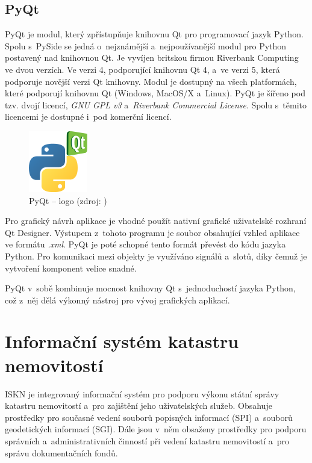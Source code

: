 \documentclass[a4paper,12pt,oneside]{book}
\begin{document}
\section{PyQt}

PyQt je modul, který zpřístupňuje knihovnu Qt pro programovací jazyk Python. Spolu s~PySide se jedná o~nejznámější a~nejpoužívanější modul pro Python postavený nad knihovnou Qt. Je vyvíjen britskou firmou Riverbank Computing ve dvou verzích. Ve verzi 4, podporující knihovnu Qt 4, a~ve verzi 5, která podporuje novější verzi Qt knihovny. Modul je dostupný na všech platformách, které podporují knihovnu Qt (Windows, MacOS/X a~Linux). PyQt je šířeno pod tzv. dvojí licencí, \textit{GNU GPL v3} a~\textit{Riverbank Commercial License}. Spolu s~těmito licencemi je dostupné i~pod komerční licencí.

\begin{figure}[htb]
\centering
\includegraphics[scale=1]{images/pyqt-logo.png}
\caption[PyQt -- logo]{PyQt -- logo (zdroj: \cite{pyqt_wiki})}
\end{figure}

Pro grafický návrh aplikace je vhodné použít nativní grafické uživatelské rozhraní Qt Designer. Výstupem z~tohoto programu je soubor obsahující vzhled aplikace ve formátu \textit{.xml}. PyQt je poté schopné tento formát převést do kódu jazyka Python. Pro komunikaci mezi objekty je využíváno signálů a~slotů, díky čemuž je vytvoření komponent velice snadné.

PyQt v~sobě kombinuje mocnost knihovny Qt s~jednoduchostí jazyka Python, což z~něj dělá výkonný nástroj pro vývoj grafických aplikací.
\cite{pyqt}
\cite{pyqt_wiki}


\clearpage
\chapter{Informační systém katastru nemovitostí}
\label{l_iskn}

ISKN je integrovaný informační systém pro podporu výkonu státní správy katastru nemovitostí a~pro zajištění jeho uživatelských služeb. Obsahuje prostředky pro současné vedení souborů popisných informací (SPI) a~souborů geodetických informací (SGI). Dále jsou v~něm obsaženy prostředky pro podporu správních a~administrativních činností při vedení katastru nemovitostí a~pro správu dokumentačních fondů. \cite{iskn}
\end{document}
